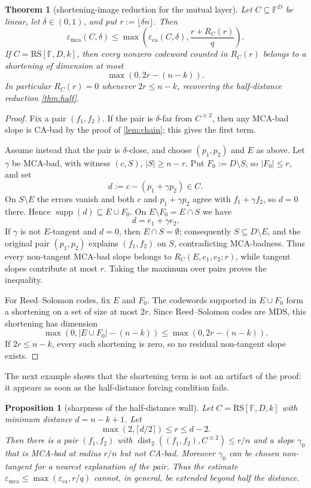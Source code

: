 \documentclass[11pt]{amsart}
\newtheorem{theorem}{Theorem}[section]
\newtheorem{proposition}[proposition]{Proposition}
\theoremstyle{definition}
\theoremstyle{remark}
\newcommand{\F}{\mathbb{F}}
\newcommand{\RS}{\mathrm{RS}}
\newcommand{\dist}{\operatorname{dist}}
\newcommand{\supp}{\operatorname{supp}}
\newcommand{\eca}{\varepsilon_{\mathrm{ca}}}
\newcommand{\emca}{\varepsilon_{\mathrm{mca}}}
\begin{document}
\begin{theorem}[shortening-image reduction for the mutual layer]
\label{thm:p2-residual-reduction}
Let $C\subseteq\F^D$ be linear, let $\delta\in(0,1)$, and put
$r:=\lfloor\delta n\rfloor$.  Then
\[
        \emca(C,\delta)
        \le
        \max\left(\eca(C,\delta),\frac{r+R_C(r)}q\right).
\]
If $C=\RS[\F,D,k]$, then every nonzero codeword counted in $R_C(r)$ belongs to a
shortening of dimension at most
\[
        \max(0,2r-(n-k)).
\]
In particular $R_C(r)=0$ whenever $2r\le n-k$, recovering the half-distance
reduction \cref{thm:half}.
\end{theorem}

\begin{proof}
Fix a pair $(f_1,f_2)$.  If the pair is $\delta$-far from $C^{\equiv2}$, then any
MCA-bad slope is CA-bad by the proof of \cref{lem:chain}; this gives the first
term.

Assume instead that the pair is $\delta$-close, and choose $(p_1,p_2)$ and $E$ as
above.  Let $\gamma$ be MCA-bad, with witness $(c,S)$, $|S|\ge n-r$.  Put
$F_0:=D\setminus S$, so $|F_0|\le r$, and set
\[
        d:=c-(p_1+\gamma p_2)\in C.
\]
On $S\setminus E$ the errors vanish and both $c$ and $p_1+\gamma p_2$ agree with
$f_1+\gamma f_2$, so $d=0$ there.  Hence
$\supp(d)\subseteq E\cup F_0$.  On $E\setminus F_0=E\cap S$ we have
\[
        d=e_1+\gamma e_2 .
\]
If $\gamma$ is not $E$-tangent and $d=0$, then $E\cap S=\emptyset$; consequently
$S\subseteq D\setminus E$, and the original pair $(p_1,p_2)$ explains
$(f_1,f_2)$ on $S$, contradicting MCA-badness.  Thus every non-tangent MCA-bad
slope belongs to $R_C(E,e_1,e_2;r)$, while tangent slopes contribute at most $r$.
Taking the maximum over pairs proves the inequality.

For Reed--Solomon codes, fix $E$ and $F_0$.  The codewords supported in
$E\cup F_0$ form a shortening on a set of size at most $2r$.  Since
Reed--Solomon codes are MDS, this shortening has dimension
\[
        \max(0,|E\cup F_0|-(n-k))\le\max(0,2r-(n-k)).
\]
If $2r\le n-k$, every such shortening is zero, so no residual non-tangent slope
exists.
\end{proof}

The next example shows that the shortening term is not an artifact of the proof:
it appears as soon as the half-distance forcing condition fails.

\begin{proposition}[sharpness of the half-distance wall]
\label{prop:p2-half-sharp}
Let $C=\RS[\F,D,k]$ with minimum distance $d=n-k+1$.  Let
\[
        \max(2,\lceil d/2\rceil)\le r\le d-2.
\]
Then there is a pair $(f_1,f_2)$ with
$\dist_2((f_1,f_2),C^{\equiv2})\le r/n$ and a slope $\gamma_0$ that is MCA-bad at
radius $r/n$ but not CA-bad.  Moreover $\gamma_0$ can be chosen non-tangent for a
nearest explanation of the pair.  Thus the estimate
$\emca\le\max(\eca,r/q)$ cannot, in general, be extended beyond half the
distance.
\end{proposition}
\end{document}
